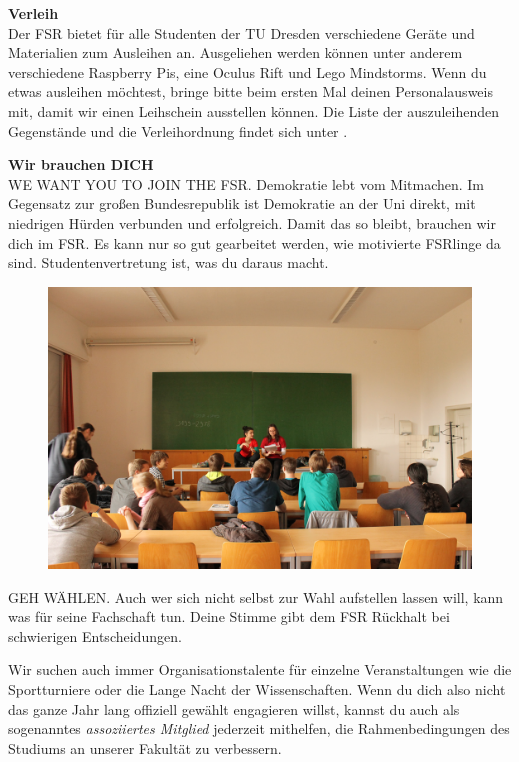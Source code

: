 \textbf{Verleih} \\
Der FSR bietet für alle Studenten der TU Dresden verschiedene Geräte und Materialien zum Ausleihen an. Ausgeliehen werden können unter anderem verschiedene Raspberry Pis, eine Oculus Rift und Lego Mindstorms.
Wenn du etwas ausleihen möchtest, bringe bitte beim ersten Mal deinen Personalausweis mit, damit wir einen Leihschein ausstellen können.
Die Liste der auszuleihenden Gegenstände und die Verleihordnung findet sich unter .

\textbf{Wir brauchen DICH} \\
WE WANT YOU TO JOIN THE FSR.
Demokratie lebt vom Mitmachen.
Im Gegensatz zur großen Bundesrepublik ist Demokratie an der Uni direkt, mit niedrigen Hürden verbunden und erfolgreich.
Damit das so bleibt, brauchen wir dich im FSR.
Es kann nur so gut gearbeitet werden, wie motivierte FSRlinge da sind.
Studentenvertretung ist, was du daraus macht.

\begin{figure}
\includegraphics[width=\linewidth]{img/ese2013/tutorium.jpg}
\end{figure}

GEH WÄHLEN.
Auch wer sich nicht selbst zur Wahl aufstellen lassen will, kann was für seine Fachschaft tun.
Deine Stimme gibt dem FSR Rückhalt bei schwierigen Entscheidungen.

Wir suchen auch immer Organisationstalente für einzelne Veranstaltungen wie die Sportturniere oder die Lange Nacht der Wissenschaften.
Wenn du dich also nicht das ganze Jahr lang offiziell gewählt engagieren willst, kannst du auch als sogenanntes \textit{assoziiertes Mitglied} jederzeit mithelfen, die Rahmenbedingungen des Studiums an unserer Fakultät zu verbessern.

